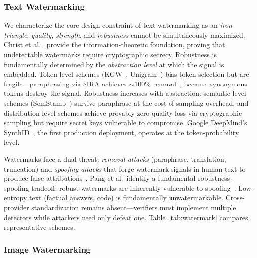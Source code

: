 \subsubsection{Text Watermarking}
\label{sec:wm-text}

We characterize the core design constraint of text watermarking as an \emph{iron triangle}: \emph{quality}, \emph{strength}, and \emph{robustness} cannot be simultaneously maximized. Christ et al.~\cite{christ2024undetectable} provide the information-theoretic foundation, proving that undetectable watermarks require cryptographic secrecy. Robustness is fundamentally determined by the \emph{abstraction level} at which the signal is embedded. Token-level schemes (KGW~\cite{kirchenbauer2023kgw}, Unigram~\cite{zhao2023unigram}) bias token selection but are fragile---paraphrasing via SIRA achieves $\sim$100\% removal~\cite{cheng2025sira}, because synonymous tokens destroy the signal. Robustness increases with abstraction: semantic-level schemes (SemStamp~\cite{hou2023semstamp}) survive paraphrase at the cost of sampling overhead, and distribution-level schemes achieve provably zero quality loss via cryptographic sampling but require secret keys vulnerable to compromise. Google DeepMind's SynthID~\cite{synthidtext2024}, the first production deployment, operates at the token-probability level.

Watermarks face a dual threat: \emph{removal attacks} (paraphrase, translation, truncation) and \emph{spoofing attacks} that forge watermark signals in human text to produce false attributions~\cite{sadasivan2023spoofing}. Pang et al.\ identify a fundamental robustness-spoofing tradeoff: robust watermarks are inherently vulnerable to spoofing~\cite{pang2024nofree}. Low-entropy text (factual answers, code) is fundamentally unwatermarkable. Cross-provider standardization remains absent---verifiers must implement multiple detectors while attackers need only defeat one. Table~\ref{tab:watermark} compares representative schemes.

\subsubsection{Image Watermarking}
\label{sec:wm-image}

